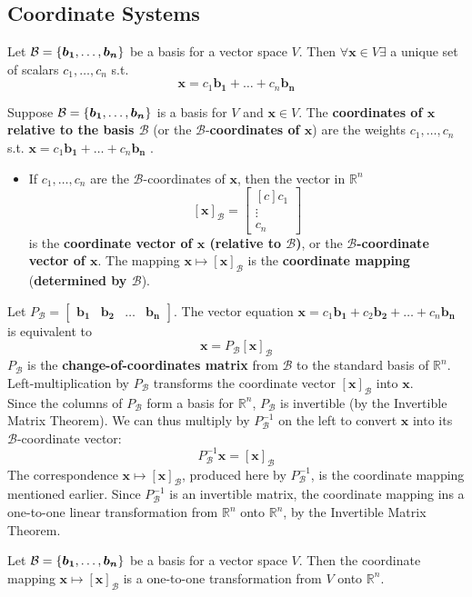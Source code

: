 \documentclass[11pt]{scrartcl}
\theoremstyle{dotlessP}
\theoremstyle{dotlessN}
\DeclarePairedDelimiter\set{\{}{\}}
\newcommand{\reals}{\mathbb{R}} %
\newcommand{\basis}{\mathcal{B}}
\begin{document}
\subsection{Coordinate Systems}
\begin{theorem}
	Let $\basis = \set*{\bm{b_1},\dots, \bm{b_n}}$ be a basis for a vector space $V$. Then $\forall \bm{x} \in V \exists$ a unique set of scalars $c_1, \dots, c_n$ s.t. 
	\[
		\bm{x} = c_1\bm{b_1} + \dots + c_n \bm{b_n}
	\] 
\end{theorem}
\begin{definition}
	Suppose $\basis = \set*{\bm{b_1},\dots, \bm{b_n}}$ is a basis for $V$ and $\bm{x} \in V$. The \textbf{coordinates of $\bm{x}$ relative to the basis $\bm{\basis}$} (or the $\bm{\basis}$-\textbf{coordinates of $\bm{x}$}) are the weights $c_1, \dots, c_n$ s.t. $\bm{x} = c_1\bm{b_1} + \dots + c_n\bm{b_n}$ .
\end{definition}
\begin{itemize}
	\item If $c_1,\dots, c_n$ are the $\basis$-coordinates of  $\bm{x}$, then the vector in $\reals^n$
		 \[
			 [\bm{x}]_{\basis} = 
			 \begin{bmatrix}[c]
			 c_1 \\
			 \vdots \\
			 c_n
			 \end{bmatrix}
		\] 
		is the \textbf{coordinate vector of $\bm{x}$ (relative to $\bm{\basis}$)}, or the \textbf{$\bm{\basis}$-coordinate vector of $\bm{x}$}. The mapping $\bm{x} \mapsto [\bm{x}]_\basis$ is the \textbf{coordinate mapping} (\textbf{determined by $\bm{\basis}$}).
\end{itemize}
\begin{remark}
	Let $P_\basis = 
\begin{bmatrix}
	\bm{b_1} & \bm{b_2} & \dots & \bm{b_n}
\end{bmatrix}
$. The vector equation $\bm{x} = c_1 \bm{b_1} + c_2\bm{b_2} + \dots + c_n \bm{b_n}$ is equivalent to
\[
	\bm{x} = P_\basis[\bm{x}]_\basis
\] 
$P_\basis$ is the \textbf{change-of-coordinates matrix} from $\basis$ to the standard basis of $\reals^n$. Left-multiplication by $P_\basis$ transforms the coordinate vector $[\bm{x}]_\basis$ into $\bm{x}$. 
\\

Since the columns of $P_\basis$ form a basis for $\reals^n$, $P_\basis$ is invertible (by the Invertible Matrix Theorem). We can thus multiply by $P_\basis^{-1}$ on the left to convert $\bm{x}$ into its $\basis$-coordinate vector:
\[
	P_\basis^{-1}\bm{x} = [\bm{x}]_\basis
\] 
The correspondence $\bm{x} \mapsto [\bm{x}]_\basis$, produced here by $P_\basis^{-1}$, is the coordinate mapping mentioned earlier. Since  $P_\basis^{-1}$ is an invertible matrix, the coordinate mapping ins a one-to-one linear transformation from $\reals^n$ onto $\reals^n$, by the Invertible Matrix Theorem.
\end{remark}
\begin{theorem}
	Let $\basis = \set*{\bm{b_1}, \dots, \bm{b_n}}$ be a basis for a vector space $V$. Then the coordinate mapping $\bm{x} \mapsto [\bm{x}]_\basis$ is a one-to-one transformation from $V$ onto $\reals^n$.
\end{theorem}
\end{document}
